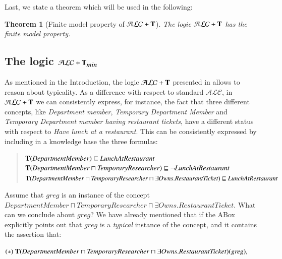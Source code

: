 \documentclass[a4paper, 11pt, oneside]{elsarticle}
\newcommand{\tip}{{\bf T}}
\newcommand{\alc}{\mathcal{ALC}}
\newcommand{\alct}{\mathcal{ALC}+\tip}
\newcommand{\alctmin}{\mathcal{ALC}+\tip_{\mbox{\em min}}}
\newcommand{\nott} {\lnot}
\newcommand{\sqset}{\sqsubseteq}
\newcommand{\mint}{\sqcap}
\newtheorem{theorem}{Theorem}
\newcounter{posu}
\newtheorem{theorem}[posu]{Theorem}
\begin{document}


Last, we state a theorem which will be used in the following:

\begin{theorem}[Finite model property of $\alct$]\label{fmpALCT}
The logic $\alct$ has the finite model property.
\end{theorem}




\subsection{The logic $\alctmin$}\label{alctmin}

As mentioned in the Introduction, the logic $\alct$ presented in \cite{FI09} allows  to reason about typicality.
As a difference with respect to standard $\alc$, in $\alct$ we can consistently express, for instance, the fact that three different concepts, like {\em Department member}, {\em Temporary Department Member} and {\em Temporary Department member having restaurant tickets}, have a different status with respect to {\em Have lunch at a restaurant}. This can be consistently expressed by including in a knowledge base the three formulas:

\begin{quote}
$\tip (\mathit{DepartmentMember}) \sqset \mathit{LunchAtRestaurant}$\\
$\tip (\mathit{DepartmentMember} \mint \mathit{TemporaryResearcher})  \sqset \nott \mathit{LunchAtRestaurant}$\\
$\tip (\mathit{DepartmentMember} \mint \mathit{TemporaryResearcher} \mint \exists \mathit{Owns}.\mathit{RestaurantTicket})  \sqset \mathit{LunchAtRestaurant}$
\end{quote}

\noindent Assume that $\mathit{greg}$ is an instance of the concept
$\mathit{DepartmentMember} \sqcap \mathit{TemporaryResearcher} \sqcap \exists \mathit{Owns}.\mathit{RestaurantTicket}$. What can we conclude about
$\mathit{\mathit{greg}}$? We have already mentioned that if the ABox explicitly points out that $\mathit{greg}$ is a {\em typical} instance of the  concept, and it contains the assertion that:

$(*)  \ \tip(\mathit{DepartmentMember} \sqcap \mathit{TemporaryResearcher} \sqcap \exists \mathit{Owns}.\mathit{RestaurantTicket})(\mathit{greg}),$
\end{document}

